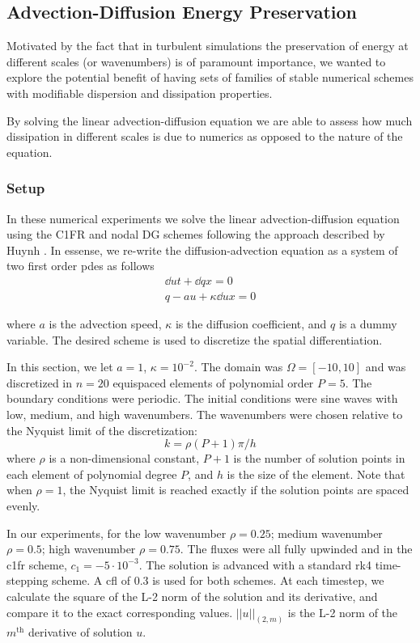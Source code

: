 \subsection{Advection-Diffusion Energy Preservation}
\label{sec:advDiff}
Motivated by the fact that in turbulent simulations the preservation of energy at different scales (or wavenumbers) is of paramount importance, we wanted to explore the potential benefit of having sets of families of stable numerical schemes with modifiable dispersion and dissipation properties.

By solving the linear advection-diffusion equation we are able to assess how much dissipation in different scales is due to numerics as opposed to the nature of the equation.

\subsubsection{Setup}

In these numerical experiments we solve the linear advection-diffusion equation using the C1FR and nodal DG schemes following the approach described by Huynh \cite{huynh2009reconstruction}. In essense, we re-write the diffusion-advection equation as a system of two first order \gls{pde}s as follows
\begin{equation}
\begin{split}
\dd{u}{t} + \dd{q}{x} = 0 \\
q - au + \kappa\dd{u}{x} = 0
\end{split}
\end{equation}

where $a$ is the advection speed, $\kappa$ is the diffusion coefficient, and $q$ is a dummy variable. The desired scheme is used to discretize the spatial differentiation.

In this section, we let $a = 1$, $\kappa = 10^{-2}$. The domain was $\Omega = [-10,10]$ and was discretized in $n = 20$ equispaced elements of polynomial order $P = 5$. The boundary conditions were periodic. The initial conditions were sine waves with low, medium, and high wavenumbers. The wavenumbers were chosen relative to the Nyquist limit of the discretization: 
\[k = \rho (P+1)\pi/h\]
 where $\rho$ is a non-dimensional constant, $P+1$ is the number of solution points in each element of polynomial degree $P$, and $h$ is the size of the element. Note that when $\rho = 1$, the Nyquist limit is reached exactly if the solution points are spaced evenly.

In our experiments, for the low wavenumber $\rho = 0.25$; medium wavenumber $\rho = 0.5$; high wavenumber $\rho = 0.75$. The fluxes were all fully upwinded and in the \gls{c1fr} scheme, $c_1 = -5\cdot10^{-3}$. The solution is advanced with a standard \gls{rk}4 time-stepping scheme. A \gls{cfl} of $0.3$ is used for both schemes. At each timestep, we calculate the square of the L-2 norm of the solution and its derivative, and compare it to the exact corresponding values. $||u||_{(2,m)} $ is the L-2 norm of the $m^{\text{th}}$ derivative of solution $u$.


